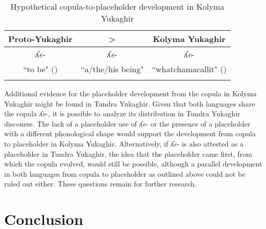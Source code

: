 \documentclass[output=paper,colorlinks,citecolor=brown
\ChapterDOI{10.5281/zenodo.15697581}
]{langscibook}
\begin{document}


\begin{table}
\begin{tabular}{@{}ccc@{}}
\lsptoprule
\textbf{Proto-Yukaghir} & \textbf{\textgreater{}} & \textbf{Kolyma Yukaghir}  \\ \midrule
\textit{ʎe}-            & \textit{ʎe}-            & \textit{ʎe}-              \\
``to be" (\Cop{})       & ``a/the/his being"     & ``whatchamacallit" (\Ph{}) \\ \lspbottomrule
\end{tabular}
\caption{Hypothetical copula-to-placeholder development in Kolyma Yukaghir}
\label{grammaticalization_pathway}
\end{table}


Additional evidence for the placeholder development from the copula in Kolyma Yukaghir might be found in Tundra Yukaghir. 
Given that both languages share the copula \textit{ʎe}-, it is possible to analyze its distribution in Tundra Yukaghir discourse. 
The lack of a placeholder use of \textit{ʎe}- or the presence of a placeholder with a different phonological shape would support the development from copula to placeholder in Kolyma Yukaghir. 
Alternatively, if \textit{ʎe}- is also attested as a placeholder in Tundra Yukaghir, the idea that the placeholder came first, from which the copula evolved, would still be possible, although a parallel development in both languages from copula to placeholder as outlined above could not be ruled out either. 
These questions remain for further research. 




\section{Conclusion} \label{sec_conclusion}
\end{document}
